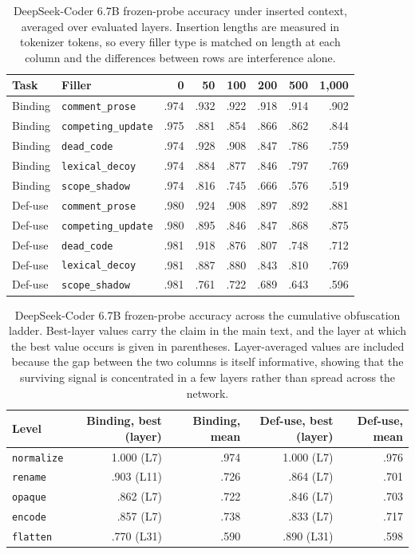 \documentclass{article}
\begin{document}
\begin{table}[htbp]
\centering
\small
\caption{DeepSeek-Coder 6.7B frozen-probe accuracy under inserted context, averaged over evaluated layers. Insertion lengths are measured in tokenizer tokens, so every filler type is matched on length at each column and the differences between rows are interference alone.}
\label{tab:app-context}
\begin{tabular}{llrrrrrr}
\toprule
Task & Filler & 0 & 50 & 100 & 200 & 500 & 1{,}000 \\
\midrule
Binding & \texttt{comment\_prose}    & .974 & .932 & .922 & .918 & .914 & .902 \\
Binding & \texttt{competing\_update} & .975 & .881 & .854 & .866 & .862 & .844 \\
Binding & \texttt{dead\_code}        & .974 & .928 & .908 & .847 & .786 & .759 \\
Binding & \texttt{lexical\_decoy}    & .974 & .884 & .877 & .846 & .797 & .769 \\
Binding & \texttt{scope\_shadow}     & .974 & .816 & .745 & .666 & .576 & .519 \\
\midrule
Def-use & \texttt{comment\_prose}    & .980 & .924 & .908 & .897 & .892 & .881 \\
Def-use & \texttt{competing\_update} & .980 & .895 & .846 & .847 & .868 & .875 \\
Def-use & \texttt{dead\_code}        & .981 & .918 & .876 & .807 & .748 & .712 \\
Def-use & \texttt{lexical\_decoy}    & .981 & .887 & .880 & .843 & .810 & .769 \\
Def-use & \texttt{scope\_shadow}     & .981 & .761 & .722 & .689 & .643 & .596 \\
\bottomrule
\end{tabular}
\end{table}

\begin{table}[htbp]
\centering
\small
\caption{DeepSeek-Coder 6.7B frozen-probe accuracy across the cumulative obfuscation ladder. Best-layer values carry the claim in the main text, and the layer at which the best value occurs is given in parentheses. Layer-averaged values are included because the gap between the two columns is itself informative, showing that the surviving signal is concentrated in a few layers rather than spread across the network.}
\label{tab:app-obf}
\begin{tabular}{lrrrr}
\toprule
Level & Binding, best (layer) & Binding, mean & Def-use, best (layer) & Def-use, mean \\
\midrule
\texttt{normalize} & 1.000 (L7)  & .974 & 1.000 (L7)  & .976 \\
\texttt{rename}    & .903 (L11)  & .726 & .864 (L7)   & .701 \\
\texttt{opaque}    & .862 (L7)   & .722 & .846 (L7)   & .703 \\
\texttt{encode}    & .857 (L7)   & .738 & .833 (L7)   & .717 \\
\texttt{flatten}   & .770 (L31)  & .590 & .890 (L31)  & .598 \\
\bottomrule
\end{tabular}
\end{table}
\end{document}

